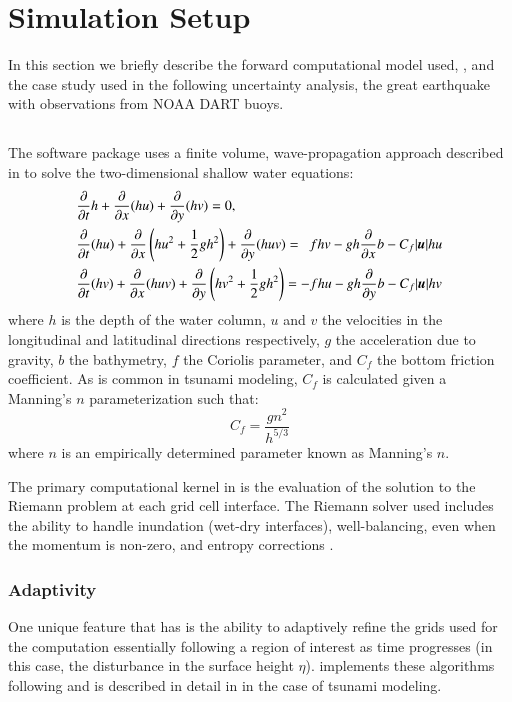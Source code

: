 
\section{Simulation Setup}

In this section we briefly describe the forward computational model used, \geoclaw, and the case study used in the following uncertainty analysis, the great \tohoku earthquake with observations from NOAA DART buoys.

\subsection{\geoclaw} \label{ssub:geoclaw}

The \geoclaw software package uses a finite volume, wave-propagation approach described in \cite{LeVeque:1997eg} to solve the two-dimensional shallow water equations:
\begin{equation} \label{eq:swe}
    \begin{aligned}
    &\pd{}{t} h + \pd{}{x} (hu) + \pd{}{y} (hv) = 0, \\
    &\pd{}{t}(hu) + \pd{}{x} \left(hu^2 + \frac{1}{2} g h^2 \right ) + \pd{}{y} (huv) = ~~ fhv - gh \pd{}{x} b - C_f |\vec{u}| hu \\
    &\pd{}{t} (hv) + \pd{}{x} (huv) + \pd{}{y} \left (hv^2 + \frac{1}{2} gh^2 \right) = -fhu - gh \pd{}{y} b - C_f |\vec{u}| hv
    \end{aligned}
\end{equation}
where $h$ is the depth of the water column, $u$ and $v$ the velocities in the 
longitudinal and latitudinal directions respectively, $g$ the acceleration due 
to gravity, $b$ the bathymetry, $f$ the Coriolis parameter, and $C_f$ the bottom 
friction coefficient.  As is common in tsunami modeling, $C_f$ is calculated 
given a Manning's $n$ parameterization such that:
\begin{equation}
    C_f = \frac{g n^2}{h^{5/3}}
\end{equation}
where $n$ is an empirically determined parameter known as Manning's $n$.  

The primary computational kernel in \geoclaw is the evaluation of the solution to the Riemann problem at each grid cell interface.  The Riemann solver used includes the ability to handle inundation (wet-dry interfaces), well-balancing, even when the momentum is non-zero, and entropy corrections \cite{George:2008aa}.

\subsubsection{Adaptivity} \label{ssub:adaptivity}
One unique feature that \geoclaw has is the ability to adaptively refine the grids used for the computation essentially following a region of interest as time progresses (in this case, the disturbance in the surface height $\eta$).  \geoclaw implements these algorithms following \cite{Berger:1984ui,Berger:1998aa} and is described in detail in \cite{Berger:2011du} in the case of tsunami modeling.

